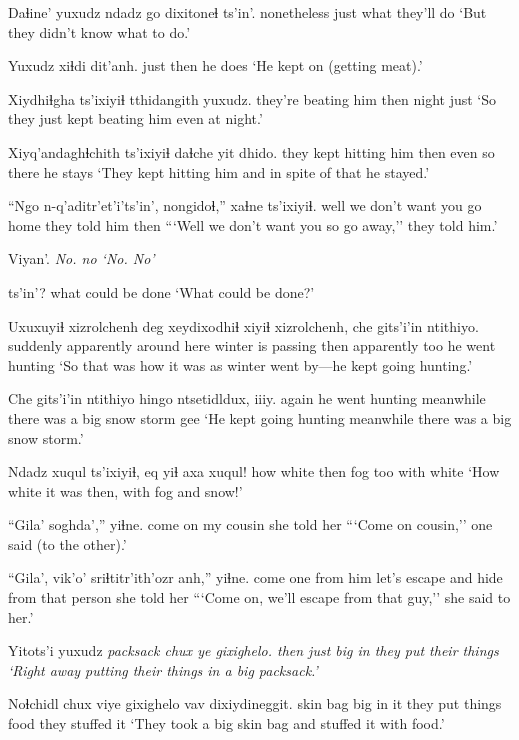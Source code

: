 \documentclass[12pt]{article}
\begin{document}
\gll Daɬine' yuxudz {ndadz go} dixitoneɬ ts'in'.
nonetheless just what {they'll do} {}
\glt `But they didn't know what to do.'
\glend

\gll Yuxudz xiɬdi dit'anh.
just then {he does}
\glt `He kept on (getting meat).'
\glend

\gll Xiydhiɬgha ts'ixiyiɬ tthidangith yuxudz.
{they're beating him} then night just
\glt `So they just kept beating him even at night.'
\glend

\gll Xiyq'andaghɬchith ts'ixiyiɬ daɬche yit dhido.
{they kept hitting him} then {even so} there {he stays}
\glt `They kept hitting him and in spite of that he stayed.'
\glend

\gll ``Ngo n-q'aditr'et'i'ts'in', nongidoɬ,'' xaɬne ts'ixiyiɬ.
well {we don't want you} {go home} {they told him} then
\glt ```Well we don't want you so go away,'' they told him.'
\glend

\gll Viyan'. \em No.
no
\glt `No. No'
\glend

 ts'in'?
{{what could be done}} {}
\glt `What could be done?'
\glend

\gll Uxuxuyiɬ xizrolchenh deg xeydixodhiɬ xiyiɬ xizrolchenh, che {gits'i'in ntithiyo.}
suddenly apparently {around here} {winter is passing} then apparently too {he went hunting}
\glt `So that was how it was as winter went by---he kept going hunting.'
\glend

\gll Che {gits'i'in ntithiyo} hingo {ntsetidldux,} iiiy.
again {he went hunting} meanwhile {there was a big snow storm} gee
\glt `He kept going hunting meanwhile there was a big snow storm.'
\glend

\gll Ndadz xuqul ts'ixiyiɬ, eq yiɬ axa xuqul!
how white then fog too with white
\glt `How white it was then, with fog and snow!'
\glend

\gll ``Gila' soghda','' yiɬne.
{come on} {my cousin} {she told her}
\glt ```Come on cousin,'' one said (to the other).'
\glend

\gll ``Gila', vik'o' sriɬtitr'ith'ozr anh,'' yiɬne.
{come one} {from him} {let's escape and hide from} {that person} {she told her}
\glt ```Come on, we'll escape from that guy,'' she said to her.'
\glend

\gll Yitots'i yuxudz \em packsack chux ye gixighelo.
then just {} big in {they put their things }
\glt `Right away putting their things in a big packsack.'
\glend

\gll Noɬchidl chux viye gixighelo vav dixiydineggit.
{skin bag} big {in it} {they put things} food {they stuffed it}
\glt `They took a big skin bag and stuffed it with food.'
\glend
\end{document}
